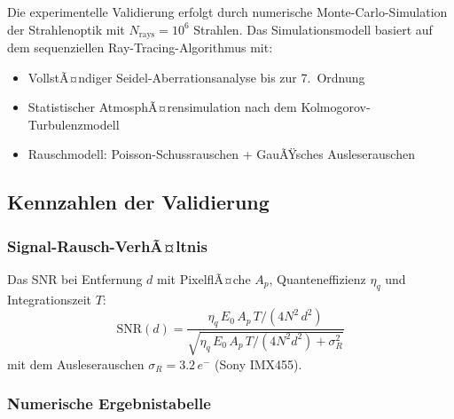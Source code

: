 ﻿\documentclass[12pt,a4paper]{article}
\theoremstyle{definition}
\begin{document}
	Die experimentelle Validierung erfolgt durch numerische Monte-Carlo-Simulation
	der Strahlenoptik mit $N_\mathrm{rays} = 10^6$ Strahlen. Das Simulationsmodell
	basiert auf dem sequenziellen Ray-Tracing-Algorithmus mit:
	\begin{itemize}
		\item VollstÃ¤ndiger Seidel-Aberrationsanalyse bis zur 7.\ Ordnung
		\item Statistischer AtmosphÃ¤rensimulation nach dem Kolmogorov-Turbulenzmodell
		\item Rauschmodell: Poisson-Schuss\-rauschen + GauÃŸsches Ausleserauschen
	\end{itemize}
	
	\subsection{Kennzahlen der Validierung}
	
	\subsubsection{Signal-Rausch-VerhÃ¤ltnis}
	
	Das SNR bei Entfernung $d$ mit PixelflÃ¤che $A_p$, Quanteneffizienz $\eta_q$
	und Integrationszeit $T$:
	\begin{equation}
		\mathrm{SNR}(d) = \frac{\eta_q\,E_0\,A_p\,T / (4N^2\,d^2)}
		{\sqrt{\eta_q\,E_0\,A_p\,T/(4N^2 d^2) + \sigma_R^2}}
		\label{eq:snr}
	\end{equation}
	mit dem Ausleserauschen $\sigma_R = 3.2\,e^-$ (Sony IMX455).
	
	\subsubsection{Numerische Ergebnistabelle}
	
\end{document}
